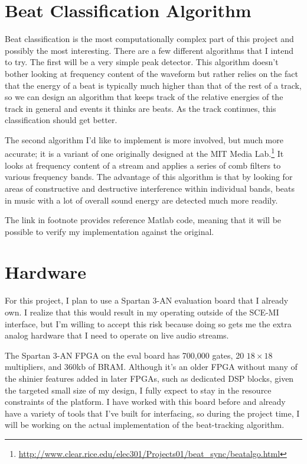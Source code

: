 \documentclass[letterpaper]{article}
\begin{document}
\section{Beat Classification Algorithm}
    
    Beat classification is the most computationally complex part of this
    project and possibly the most interesting.  There are a few different
    algorithms that I intend to try.  The first will be a very simple peak
    detector.  This algorithm doesn't bother looking at frequency content of
    the waveform but rather relies on the fact that the energy of a beat is
    typically much higher than that of the rest of a track, so we can design an
    algorithm that keeps track of the relative energies of the track in general
    and events it thinks are beats.  As the track continues, this
    classification should get better.

    The second algorithm I'd like to implement is more involved, but much more
    accurate; it is a variant of one originally designed at the MIT Media
    Lab.\footnote{\url{http://www.clear.rice.edu/elec301/Projects01/beat\_sync/beatalgo.html}}
    It looks at frequency content of a stream and applies a series of comb
    filters to various frequency bands.  The advantage of this algorithm is
    that by looking for areas of constructive and destructive interference
    within individual bands, beats in music with a lot of overall sound energy
    are detected much more readily.

    The link in footnote provides reference Matlab code, meaning that it will
    be possible to verify my implementation against the original.


\section{Hardware}

    For this project, I plan to use a Spartan 3-AN evaluation board that I
    already own.  I realize that this would result in my operating outside of
    the SCE-MI interface, but I'm willing to accept this risk because doing so
    gets me the extra analog hardware that I need to operate on live audio
    streams.

    The Spartan 3-AN FPGA on the eval board has 700,000 gates, 20 $18 \times
    18$ multipliers, and 360kb of BRAM.  Although it's an older FPGA without
    many of the shinier features added in later FPGAs, such as dedicated DSP
    blocks,  given the targeted small size of my design, I fully expect to stay
    in the resource constraints of the platform.  I have worked with this board
    before and already have a variety of tools that I've built for interfacing,
    so during the project time, I will be working on the actual implementation
    of the beat-tracking algorithm.
\end{document}
